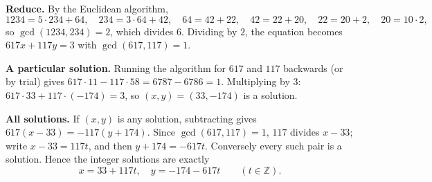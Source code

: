 \textbf{Reduce.} By the Euclidean algorithm,
\[
1234=5\cdot234+64,\quad 234=3\cdot64+42,\quad 64=42+22,\quad 42=22+20,\quad 22=20+2,\quad 20=10\cdot2,
\]
so $\gcd(1234,234)=2$, which divides $6$. Dividing by $2$, the equation becomes $617x+117y=3$ with $\gcd(617,117)=1$.

\textbf{A particular solution.} Running the algorithm for $617$ and $117$ backwards (or by trial) gives $617\cdot11-117\cdot58=6787-6786=1$. Multiplying by $3$: $617\cdot33+117\cdot(-174)=3$, so $(x,y)=(33,-174)$ is a solution.

\textbf{All solutions.} If $(x,y)$ is any solution, subtracting gives $617(x-33)=-117(y+174)$. Since $\gcd(617,117)=1$, $117$ divides $x-33$; write $x-33=117t$, and then $y+174=-617t$. Conversely every such pair is a solution. Hence the integer solutions are exactly
\[
\boxed{x=33+117t,\quad y=-174-617t\qquad(t\in\mathbb Z)}.
\]
